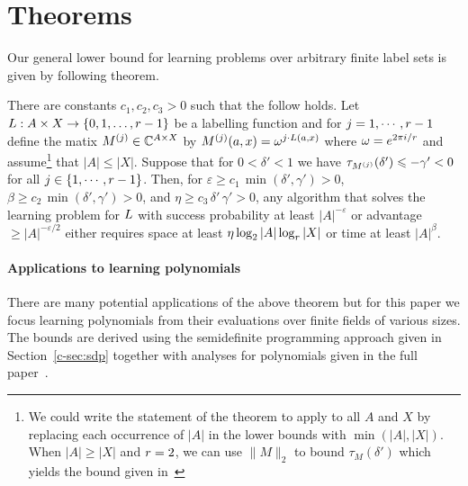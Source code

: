 \section{Theorems}
\label{sec:multivalued}
\label{sec:theorems}


Our general lower bound for learning problems over arbitrary finite label sets
is given by following theorem.

\begin{theorem}
\label{c-thm:mainlb}
There are constants $c_1,c_2,c_3>0$ such that the follow holds.
Let $L:A\times X\rightarrow \{0,1,\ldots, r-1\}$ be a labelling
function 
and for $j=1,\cdots,r-1$ define the matix $M^{(j)}\in \mathbb{C}^{A\times X}$
by $M^{(j)}(a,x)=\omega^{j\cdot L(a,x)}$ where $\omega=e^{2\pi i/r}$ and 
assume\footnote{We could write the statement of the theorem to apply to all $A$ and $X$ by
replacing each occurrence of $|A|$ in the lower bounds with $\min(|A|,|X|)$.
When $|A|\ge |X|$ and $r=2$, we can use $\|M\|_2$ to
bound $\tau_M(\delta')$ which yields
the bound given in~\cite{DBLP:conf/focs/Raz17}} that $|A|\leq |X|$.
Suppose that for $0<\delta'<1$ we have
 $\tau_{M^{(j)}}(\delta')\leqslant -\gamma'<0$
for all $j\in \{1,\cdots,r-1\}$.
Then, for $\varepsilon\ge c_1\, \min(\delta',\gamma')>0$,
$\beta\ge c_2\, \min(\delta',\gamma')>0$, and $\eta\ge c_3\,\delta'\, \gamma'>0$,
any algorithm that solves the learning problem for $L$ with
success probability at least $|A|^{-\varepsilon}$ or advantage
$\ge |A|^{-\varepsilon/2}$ either requires
space at least $\eta \log_2|A|\log_{r}|X|$ or time at least $|A|^{\beta}$.
\end{theorem}

\paragraph{Applications to learning polynomials}

There are many potential applications of the above theorem but for this paper
we focus learning polynomials from
their evaluations over finite fields of various sizes.  The bounds are 
derived using the semidefinite programming approach given in
Section~\ref{c-sec:sdp} together with analyses for polynomials given
in the full paper~\citep{bogy:learning-coltfull-tr}.

